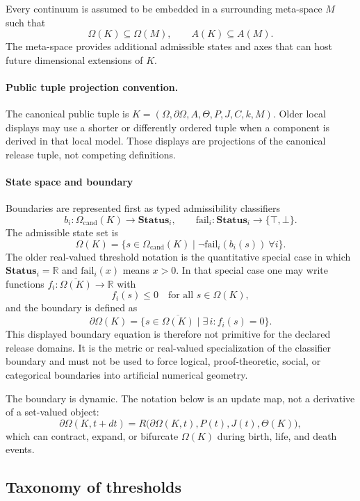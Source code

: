 Every continuum is assumed to be embedded in a surrounding meta-space \(M\) such that
\[
    \Omega(K)\subseteq\Omega(M), \qquad A(K)\subseteq A(M).
\]
The meta-space provides additional admissible states and axes that can host future dimensional extensions of \(K\).

\paragraph{Public tuple projection convention.}
The canonical public tuple is \(K=(\Omega,\partial\Omega,A,\Theta,P,J,C,k,M)\). Older local displays may use a shorter or differently ordered tuple when a component is derived in that local model. Those displays are projections of the canonical release tuple, not competing definitions.

\paragraph{State space and boundary}
Boundaries are represented first as typed admissibility classifiers
\[
    b_i:\Omega_{\mathrm{cand}}(K)\to \mathbf{Status}_i,
    \qquad
    \mathrm{fail}_i:\mathbf{Status}_i\to\{\top,\bot\}.
\]
The admissible state set is
\[
    \Omega(K)=\{s\in\Omega_{\mathrm{cand}}(K)\mid
    \neg\mathrm{fail}_i(b_i(s))\ \forall i\}.
\]
The older real-valued threshold notation is the quantitative special case in
which \(\mathbf{Status}_i=\mathbb{R}\) and \(\mathrm{fail}_i(x)\) means
\(x>0\). In that special case one may write functions
\(f_i : \overline{\Omega(K)} \to \mathbb{R}\) with
\[
    f_i(s) \le 0 \quad\text{for all } s \in \Omega(K),
\]
and the boundary is defined as
\[
    \partial\Omega(K) = \{ s \in \overline{\Omega(K)} \mid \exists\, i: f_i(s) = 0 \}.
\]
This displayed boundary equation is therefore not primitive for the declared release domains. It
is the metric or real-valued specialization of the classifier boundary and
must not be used to force logical, proof-theoretic, social, or categorical
boundaries into artificial numerical geometry.

The boundary is dynamic. The notation below is an update map, not a derivative
of a set-valued object:
\[
    \partial\Omega(K,t+dt) =
    R\big(\partial\Omega(K,t),P(t),J(t),\Theta(K)\big),
\]
which can contract, expand, or bifurcate \(\Omega(K)\) during birth, life, and death events.

\subsection{Taxonomy of thresholds}

